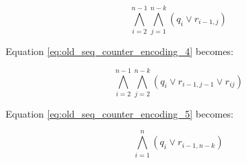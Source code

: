 \begin{equation}
    \label{eq:old_seq_counter_encoding_3_at_least}
    \bigwedge_{i=2}^{n-1} \bigwedge_{j=1}^{n-k} \left( q_i \vee r_{i-1,j} \right)
\end{equation}

Equation \ref{eq:old_seq_counter_encoding_4} becomes:

\begin{equation}
    \label{eq:old_seq_counter_encoding_4_at_least}
    \bigwedge_{i=2}^{n-1} \bigwedge_{j=2}^{n-k} \left( q_i \vee r_{i-1,j-1} \vee r_{ij} \right)
\end{equation}

Equation \ref{eq:old_seq_counter_encoding_5} becomes:

\begin{equation}
    \label{eq:old_seq_counter_encoding_5_at_least}
    \bigwedge_{i=1}^{n} \left( q_i \vee r_{i-1,n-k} \right)
\end{equation}

